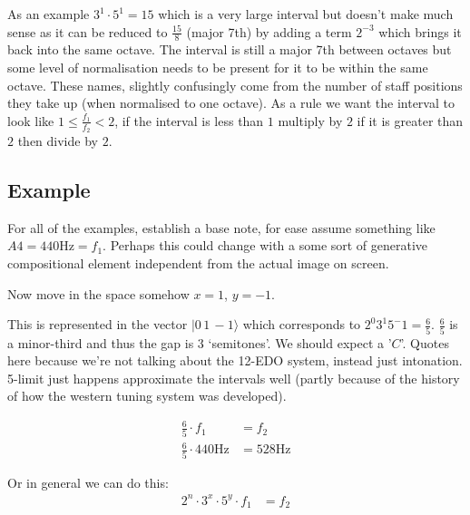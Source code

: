 As an example $3^1 \cdot 5^1 = 15$ which is a very large interval but doesn't make much sense as it
can be reduced to $\frac{15}{8}$ (major 7th) by adding a term $2^{-3}$ which brings it back into the
same octave. The interval is still a major 7th between octaves but some level of normalisation
needs to be present for it to be within the same octave. These names, slightly confusingly come from
the number of staff positions they take up (when normalised to one octave). As a rule we want the
interval to look like $1 \leq \frac{f_1}{f_2} < 2$, if the interval is less than $1$ multiply by $2$
if it is greater than $2$ then divide by $2$.

\subsection{Example}
For all of the examples, establish a base note, for ease assume something like $A4 = 440\si{\hertz}
= f_1$. Perhaps this could change with a some sort of generative compositional element independent
from the actual image on screen.

Now move in the space somehow $x=1$, $y=-1$.

\begin{center}
\end{center}

This is represented in the vector $|0\, 1\, -1\rangle$ which corresponds to $2^0 3^1 5^-1 =
\frac{6}{5}$. $\frac{6}{5}$ is a minor-third and thus the gap is 3 `semitones'. We should expect a
'$C$'. Quotes here because we're not talking about the 12-EDO system, instead just intonation.
5-limit just happens approximate the intervals well (partly because of the history of how the
western tuning system was developed).

\begin{align*}
    \frac{6}{5} \cdot f_1 &= f_2\\
    \frac{6}{5} \cdot 440\si{\hertz} &= 528\si{\hertz}
\end{align*}

Or in general we can do this:
\begin{align*}
    2^n \cdot 3^x \cdot 5^y \cdot f_1 &= f_2\\
\end{align*}

